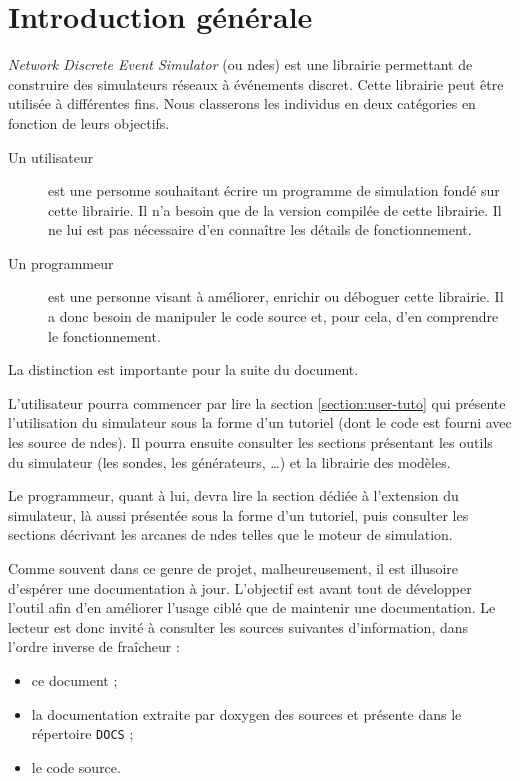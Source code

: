 %
\section{Introduction générale}

   {\em Network Discrete Event Simulator} (ou {\sc ndes}) est une
librairie permettant de construire des simulateurs réseaux à
événements discret. Cette librairie peut être utilisée à différentes
fins. Nous classerons les individus en deux catégories en fonction de
leurs objectifs.

\begin{description}
   \item[Un utilisateur] est une personne souhaitant écrire un
     programme de simulation fondé sur cette librairie. Il n'a besoin
     que de la version compilée de cette librairie. Il ne lui est pas
     nécessaire d'en connaître les détails de fonctionnement.
   \item[Un programmeur] est une personne visant à améliorer, enrichir
     ou déboguer cette librairie. Il a donc besoin de manipuler le
     code source et, pour cela, d'en comprendre le fonctionnement.
\end{description}

   La distinction est importante pour la suite du
document.

   L'utilisateur pourra commencer par lire la section
\ref{section:user-tuto} qui présente l'utilisation du simulateur sous
la forme d'un tutoriel (dont le code est fourni avec les source de
{\sc ndes}). Il pourra ensuite consulter les sections présentant les
outils du simulateur (les sondes, les générateurs, \ldots) et la
librairie des modèles.

   Le programmeur, quant à lui, devra lire la section dédiée à
l'extension du simulateur, là aussi présentée sous la forme d'un
tutoriel, puis consulter les sections décrivant les arcanes de {\sc
  ndes} telles que le moteur de simulation.

   Comme souvent dans ce genre de projet, malheureusement, il est
illusoire d'espérer une documentation à jour. L'objectif est avant
tout de développer l'outil afin d'en améliorer l'usage ciblé que de
maintenir une documentation. Le lecteur est donc invité à consulter
les sources suivantes d'information, dans l'ordre inverse de fraîcheur
:

\begin{itemize}
   \item ce document ;
   \item la documentation extraite par doxygen des sources et présente
     dans le répertoire {\tt DOCS} ;
   \item le code source.
\end{itemize}

